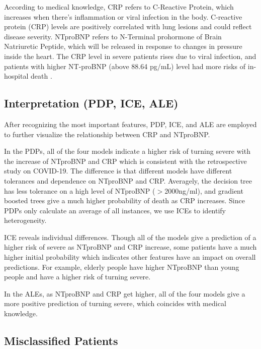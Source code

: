According to medical knowledge, CRP refers to C-Reactive Protein, which increases when there's inflammation or viral infection in the body. C-reactive protein (CRP) levels are positively correlated with lung lesions and could reflect disease severity\citep{WANG2020332}. NTproBNP refers to N-Terminal prohormone of Brain Natriuretic Peptide, which will be released in response to changes in pressure inside the heart. The CRP level in severe patients rises due to viral infection, and patients with higher NT-proBNP (above 88.64 pg/mL) level had more risks of in-hospital death \citep{Gao2020.03.07.20031575}.


\newpage
\subsection{Interpretation (PDP, ICE, ALE)}

After recognizing the most important features, PDP, ICE, and ALE are employed to further visualize the relationship between CRP and NTproBNP.

In the PDPs, all of the four models indicate a higher risk of turning severe with the increase of NTproBNP and CRP which is consistent with the retrospective study on COVID-19. The difference is that different models have different tolerances and dependence on NTproBNP and CRP. Averagely, the decision tree has less tolerance on a high level of NTproBNP ($>$2000ng/ml), and gradient boosted trees give a much higher probability of death as CRP increases. Since PDPs only calculate an average of all instances, we use ICEs to identify heterogeneity.
    
ICE reveals individual differences. Though all of the models give a prediction of a higher risk of severe as NTproBNP and CRP increase, some patients have a much higher initial probability which indicates other features have an impact on overall predictions. For example, elderly people have higher NTproBNP than young people and have a higher risk of turning severe.

In the ALEs,  as NTproBNP and CRP get higher, all of the four models give a more positive prediction of turning severe, which coincides with medical knowledge.


\subsection{Misclassified Patients}

